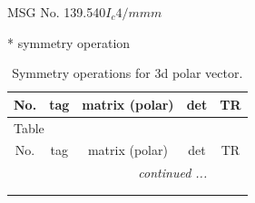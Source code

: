 \documentclass[fleqn,8pt]{jsarticle}
\begin{document}
\setcounter{MaxMatrixCols}{32}

\renewcommand{\tablename}{Table~}
\renewcommand{\figurename}{Figure~}
\begin{center}
\LARGE
MSG No. 139.540\quad$I_{c}4/mmm$
\end{center}
* symmetry operation
\renewcommand{\arraystretch}{1.3}
\begin{longtable}{ccccc}
\caption{Symmetry operations for 3d polar vector.}
 \\
 \hline \hline
No. & tag & matrix (polar) & det & TR \\ \hline \endfirsthead

\multicolumn{4}{l}{\tablename\ \thetable{}} \\
 \hline \hline
No. & tag & matrix (polar) & det & TR \\ \hline \endhead

 \hline \hline
\multicolumn{4}{r}{\footnotesize\it continued ...} \\ \endfoot

 \hline \hline
\multicolumn{4}{r}{} \\ \endlastfoot


\end{longtable}
\end{document}
